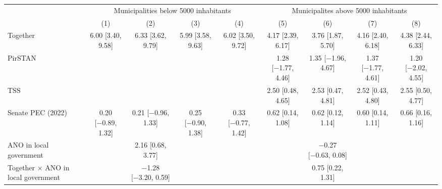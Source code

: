 \begin{tabular}{lcccc|cccc}
\toprule
& \multicolumn{4}{c|}{Municipalities below 5000 inhabitants} & \multicolumn{4}{c}{Municipalites above 5000 inhabitants} \\
& (1) & (2) & (3) & (4) & (5) & (6) & (7) & (8) \\ \midrule
Together                                    & \num{6.00} [\num{3.40}, \num{9.58}]    & \num{6.33} [\num{3.62}, \num{9.79}]    & \num{5.99} [\num{3.58}, \num{9.63}]    & \num{6.02} [\num{3.50}, \num{9.72}]    & \num{4.17} [\num{2.39}, \num{6.17}]    & \num{3.76} [\num{1.87}, \num{5.70}]    & \num{4.16} [\num{2.40}, \num{6.18}]    & \num{4.38} [\num{2.44}, \num{6.33}]    \\
PirSTAN                                  &                                           &                                           &                                           &                                           & \num{1.28} [\num{-1.77}, \num{4.46}]   & \num{1.35} [\num{-1.96}, \num{4.67}]   & \num{1.37} [\num{-1.77}, \num{4.61}]   & \num{1.20} [\num{-2.02}, \num{4.55}]   \\
TSS                                      &                                           &                                           &                                           &                                           & \num{2.50} [\num{0.48}, \num{4.65}]    & \num{2.53} [\num{0.47}, \num{4.81}]    & \num{2.52} [\num{0.43}, \num{4.80}]    & \num{2.55} [\num{0.50}, \num{4.77}]    \\
Senate PEC (2022)                         & \num{0.20} [\num{-0.89}, \num{1.32}]   & \num{0.21} [\num{-0.96}, \num{1.33}]   & \num{0.25} [\num{-0.90}, \num{1.38}]   & \num{0.33} [\num{-0.77}, \num{1.42}]   & \num{0.62} [\num{0.14}, \num{1.08}]    & \num{0.62} [\num{0.12}, \num{1.14}]    & \num{0.60} [\num{0.14}, \num{1.11}]    & \num{0.66} [\num{0.16}, \num{1.16}]    \\
ANO in local government                         &                                           & \num{2.16} [\num{0.68}, \num{3.77}]    &                                           &                                           &                                           & \num{-0.27} [\num{-0.63}, \num{0.08}]  &                                           &                                           \\
Together × ANO in local government                   &                                           & \num{-1.28} [\num{-3.20}, \num{0.59}]  &                                           &                                           &                                           & \num{0.75} [\num{0.22}, \num{1.31}]    &                                           &                                           \\

\end{tabular}
